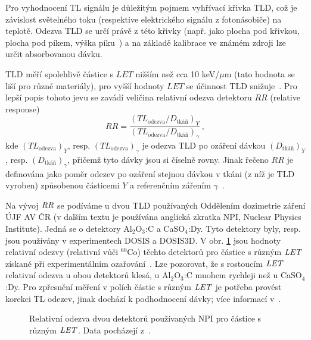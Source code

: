 Pro vyhodnocení TL signálu je důležitým pojmem vyhřívací křivka TLD, což je závislost světelného toku (respektive elektrického signálu z fotonásobiče) na teplotě. Odezva TLD se určí právě z této křivky (např. jako plocha pod křivkou, plocha pod píkem, výška píku~\cite{dosis}) a na základě kalibrace ve známém zdroji lze určit absorbovanou dávku.

TLD měří spolehlivě částice s $\mathit{LET}$ nižším než cca 10 keV/$\mu$m (tato hodnota se liší pro různé materiály), pro vyšší hodnoty $\mathit{LET}$ se účinnost TLD snižuje~\cite{passDetectors}. Pro lepší popis tohoto jevu se zavádí veličina relativní odezva detektoru $\mathit{RR}$ (relative response)
\begin{equation}
  \mathit{RR}=\frac{\left(TL_{\text{odezva}}/D_{\text{tkáň}}\right)_Y}{\left(TL_{\text{odezva}}/D_{\text{tkáň}}\right)_{\gamma}}\,,
  \label{eq:detektory_TLD_RR}
\end{equation}
kde $(TL_{\text{odezva}})_Y$, resp. $(TL_{\text{odezva}})_{\gamma}$ je odezva TLD po ozáření dávkou $(D_{\text{tkáň}})_Y$, resp. $(D_{\text{tkáň}})_{\gamma}$, přičemž tyto dávky jsou si číselně rovny. Jinak řečeno $\mathit{RR}$ je definována jako poměr odezev po ozáření stejnou dávkou v tkáni (z níž je TLD vyroben) způsobenou částicemi $Y$ a referenčním zářením $\gamma$~\cite{TLD_RR}. 

Na vývoj $\mathit{RR}$ se podíváme u dvou TLD používaných Oddělením dozimetrie záření ÚJF AV ČR (v dalším textu je používána anglická zkratka NPI, Nuclear Physics Institute). Jedná se o detektory Al$_2$O$_3$:C a CaSO$_4$:Dy. Tyto detektory byly, resp. jsou používány v experimentech DOSIS a DOSIS3D. V obr. \ref{fig:detektory_TLD_RR} jsou hodnoty relativní odezvy (relativní vůči $^{60}$Co) těchto detektorů pro částice s různým $\mathit{LET}$ získané při experimentálním ozařování~\cite{dataTLD_RR}. Lze pozorovat, že s rostoucím $\mathit{LET}$ relativní odezva u obou detektorů klesá, u Al$_2$O$_3$:C mnohem rychleji než u CaSO$_4$:Dy. Pro zpřesnění měření v polích částic s různým $\mathit{LET}$ je potřeba provést korekci TL odezev, jinak dochází k podhodnocení dávky; více informací v~\cite{TLD_RR}.
\begin{figure}[H]
  \centering
  
  \caption{Relativní odezva dvou detektorů používaných NPI pro částice s různým $\mathit{LET}$. Data pocházejí z~\cite{dataTLD_RR}.}
  \label{fig:detektory_TLD_RR}
\end{figure}
